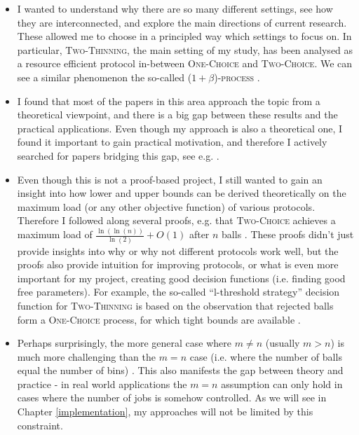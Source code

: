 \begin{itemize}
    \item 
    I wanted to understand why there are so many different settings, see how they are interconnected, and explore the main directions of current research. These allowed me to choose in a principled way which settings to focus on. In particular, \textsc{Two-Thinning}, the main setting of my study, has been analysed as a resource efficient protocol in-between \textsc{One-Choice} and \textsc{Two-Choice}. We can see a similar phenomenon the so-called \textsc{($1+\beta$)-process} \cite{peres2015oneplusbeta}.
    \item
    I found that most of the papers in this area approach the topic from a theoretical viewpoint, and there is a big gap between these results and the practical applications. Even though my approach is also a theoretical one, I found it important to gain practical motivation, and therefore I actively searched for papers bridging this gap, see e.g. \cite{wang2017twochoicerouting}.
    \item
    Even though this is not a proof-based project, I still wanted to gain an insight into how lower and upper bounds can be derived theoretically on the maximum load (or any other objective function) of various protocols. Therefore I followed along several proofs, e.g. that \textsc{Two-Choice} achieves a maximum load of $\frac{\ln(\ln(n))}{\ln(2)} + O(1)$ after $n$ balls \cite{azar1999twochoice}. These proofs didn't just provide insights into why or why not different protocols work well, but the proofs also provide intuition for improving protocols, or what is even more important for my project, creating good decision functions (i.e. finding good free parameters). For example, the so-called ``l-threshold strategy'' decision function for \textsc{Two-Thinning} is based on the observation that rejected balls form a \textsc{One-Choice} process, for which tight bounds are available \cite{feldheim2021thinning}.
    \item
    Perhaps surprisingly, the more general case where $m\neq n$ (usually $m>n$) is much more challenging than the $m=n$ case (i.e. where the number of balls equal the number of bins) \cite{berenbrink2006heavilyloaded}. This also manifests the gap between theory and practice - in real world applications the $m=n$ assumption can only hold in cases where the number of jobs is somehow controlled. As we will see in Chapter \ref{implementation}, my approaches will not be limited by this constraint.

\end{itemize}
